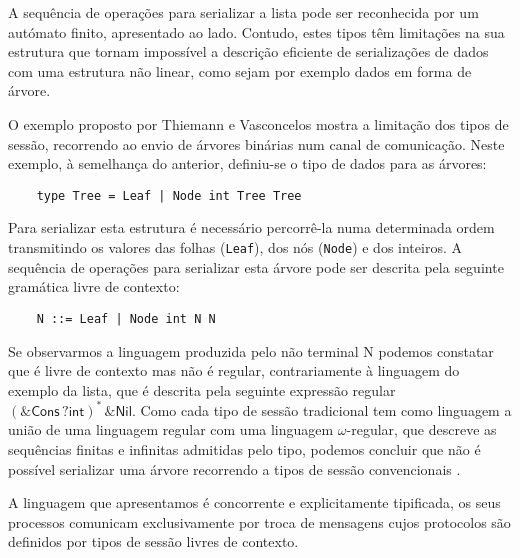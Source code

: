 
 
A sequência de operações para serializar a lista pode ser reconhecida
por um autómato finito, apresentado ao lado.
Contudo, estes tipos têm limitações na sua estrutura
que tornam impossível a descrição eficiente de serializações de dados com uma estrutura não linear, como sejam por exemplo dados em forma de árvore.

O exemplo proposto por Thiemann e Vasconcelos \cite{ref-cfst}
mostra a limitação dos tipos de sessão, recorrendo ao envio de árvores binárias num canal de comunicação. Neste exemplo, à semelhança do anterior, definiu-se o tipo de dados para as árvores:
\begin{lstlisting}
	type Tree = Leaf | Node int Tree Tree
\end{lstlisting}
Para serializar esta estrutura é necessário percorrê-la numa determinada ordem transmitindo os valores das folhas (\lstinline"Leaf"), dos nós (\lstinline"Node") e dos inteiros. A sequência de operações para serializar esta árvore pode ser descrita pela seguinte gramática livre de contexto:
\begin{lstlisting}
	N ::= Leaf | Node int N N
\end{lstlisting}
Se observarmos a linguagem produzida pelo não terminal N podemos constatar que é livre de contexto mas não é regular, contrariamente à linguagem do exemplo da lista, que é descrita pela seguinte expressão regular $(\&\textsf{Cons}\,?\textsf{int})^{*}\,\&\textsf{Nil}$. Como cada tipo de sessão tradicional tem como linguagem a união de uma linguagem regular com uma linguagem $\omega$-regular, que descreve as sequências finitas e infinitas admitidas pelo tipo, podemos concluir que não é possível serializar uma árvore recorrendo a tipos de sessão convencionais \cite{ref-lang-primitives}.

A linguagem que apresentamos é concorrente e explicitamente tipificada, os seus processos comunicam exclusivamente por troca de mensagens cujos protocolos são definidos por tipos de sessão livres de contexto.


